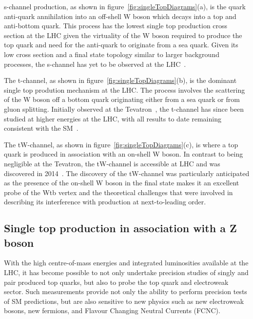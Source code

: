 
s-channel production, as shown in figure~\ref{fig:singleTopDiagrams}(a), is the quark anti-quark annihilation into an off-shell W boson which decays into a top and anti-bottom quark.
This process has the lowest single top production cross section at the LHC given the virtuality of the W boson required to produce the top quark and need for the anti-quark to originate from a sea quark.
Given its low cross section and a final state topology similar to larger background processes, the s-channel has yet to be observed at the LHC~\cite{Khachatryan:2016ewo}.

The t-channel, as shown in figure~\ref{fig:singleTopDiagrams}(b), is the dominant single top prodution mechanism at the LHC.
The process involves the scattering of the W boson off a bottom quark originating either from a sea quark or from gluon splitting.
Initially observed at the Tevatron~\cite{Aaltonen:2009jj,Abazov:2009ii}, the t-channel has since been studied at higher energies at the LHC, with all results to date remaining consistent with the SM~\cite{Berta:2017ghf,Morton:2018wkb}.	

The tW-channel, as shown in figure~\ref{fig:singleTopDiagrams}(c), is where a top quark is produced in association with an on-shell W boson.
In contrast to being negligible at the Tevatron, the tW-channel is accessible at LHC and was discovered in 2014~\cite{Chatrchyan:2014tua}.
The discovery of the tW-channel was particularly anticipated as the presence of the on-shell W boson in the final state makes it an excellent probe of the Wtb vertex and the theoretical challenges that were involved in describing its interference with \ttbar production at next-to-leading order.

\subsection{Single top production in association with a Z boson}\label{subsec:tZqTheory}
With the high centre-of-mass energies and integrated luminosities available at the LHC, it has become possible to not only undertake precision studies of singly and pair produced top quarks, but also to probe the top quark and electroweak sector.
Such measurements provide not only the ability to perform precision tests of SM predictions, but are also sensitive to new physics such as new electroweak bosons, new fermions, and Flavour Changing Neutral Currents (FCNC).

